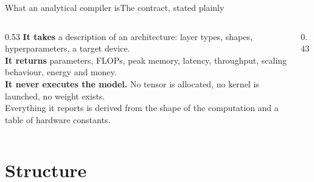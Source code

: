 \documentclass[aspectratio=169,11pt]{beamer}
\newcommand{\good}[1]{\textcolor{nxMoss}{#1}}
\newcommand{\bad}[1]{\textcolor{nxRose}{#1}}
\newcommand{\subtle}[1]{{\footnotesize\color{nxSlate}#1}}
\begin{document}
\begin{frame}{What an analytical compiler is}{The contract, stated plainly}
  \vspace{0.25cm}
  \begin{columns}[T]
    \begin{column}{0.53\textwidth}
      {\bfseries It takes} a description of an architecture: layer types,
      shapes, hyperparameters, a target device.\\[10pt]
      {\bfseries It returns} parameters, FLOPs, peak memory, latency,
      throughput, scaling behaviour, energy and money.\\[10pt]
      {\bfseries It never executes the model.} No tensor is allocated, no
      kernel is launched, no weight exists.\\[10pt]
      \subtle{Everything it reports is derived from the shape of the computation
      and a table of hardware constants.}
    \end{column}
    \begin{column}{0.43\textwidth}
    \end{column}
  \end{columns}
\end{frame}

\section{Structure}
\end{document}
